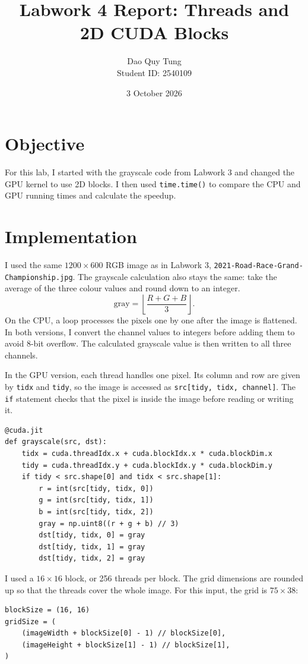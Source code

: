\documentclass[11pt,a4paper]{article}
\title{Labwork 4 Report: Threads and 2D CUDA Blocks}
\author{Dao Quy Tung \\ Student ID: 2540109}
\date{3 October 2026}
\begin{document}
\maketitle

\section{Objective}
For this lab, I started with the grayscale code from Labwork 3 and changed
the GPU kernel to use 2D blocks.
I then used \texttt{time.time()} to compare the CPU and GPU running times
and calculate the speedup.

\section{Implementation}
I used the same $1200\times600$ RGB image as in Labwork 3,
\texttt{2021-Road-Race-Grand-Championship.jpg}. The grayscale calculation
also stays the same: take the average of the three colour values and
round down to an integer.
\[
\mathrm{gray}=\left\lfloor\frac{R+G+B}{3}\right\rfloor.
\]
On the CPU, a loop processes the pixels one by one after the image is
flattened. In both versions, I convert the channel values to integers
before adding them to avoid 8-bit overflow. The calculated grayscale
value is then written to all three channels.

In the GPU version, each thread handles one pixel. Its column and row
are given by \texttt{tidx} and \texttt{tidy}, so the image is accessed as
\texttt{src[tidy, tidx, channel]}. The \texttt{if} statement checks that
the pixel is inside the image before reading or writing it.
\begin{lstlisting}
@cuda.jit
def grayscale(src, dst):
    tidx = cuda.threadIdx.x + cuda.blockIdx.x * cuda.blockDim.x
    tidy = cuda.threadIdx.y + cuda.blockIdx.y * cuda.blockDim.y
    if tidy < src.shape[0] and tidx < src.shape[1]:
        r = int(src[tidy, tidx, 0])
        g = int(src[tidy, tidx, 1])
        b = int(src[tidy, tidx, 2])
        gray = np.uint8((r + g + b) // 3)
        dst[tidy, tidx, 0] = gray
        dst[tidy, tidx, 1] = gray
        dst[tidy, tidx, 2] = gray
\end{lstlisting}

I used a $16\times16$ block, or 256 threads per block. The grid dimensions
are rounded up so that the threads cover the whole image. For this input,
the grid is $75\times38$:
\begin{lstlisting}
blockSize = (16, 16)
gridSize = (
    (imageWidth + blockSize[0] - 1) // blockSize[0],
    (imageHeight + blockSize[1] - 1) // blockSize[1],
)
\end{lstlisting}
\end{document}
